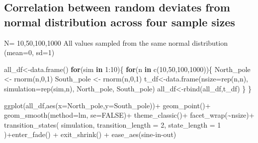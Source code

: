 \documentclass[
  letterpaper,
  DIV=11,
  numbers=noendperiod]{scrreprt}
\newenvironment{Shaded}{\begin{snugshade}}{\end{snugshade}}
\newcommand{\AttributeTok}[1]{\textcolor[rgb]{0.40,0.45,0.13}{#1}}
\newcommand{\ConstantTok}[1]{\textcolor[rgb]{0.56,0.35,0.01}{#1}}
\newcommand{\ControlFlowTok}[1]{\textcolor[rgb]{0.00,0.23,0.31}{\textbf{#1}}}
\newcommand{\DecValTok}[1]{\textcolor[rgb]{0.68,0.00,0.00}{#1}}
\newcommand{\FunctionTok}[1]{\textcolor[rgb]{0.28,0.35,0.67}{#1}}
\newcommand{\NormalTok}[1]{\textcolor[rgb]{0.00,0.23,0.31}{#1}}
\newcommand{\OtherTok}[1]{\textcolor[rgb]{0.00,0.23,0.31}{#1}}
\newcommand{\SpecialCharTok}[1]{\textcolor[rgb]{0.37,0.37,0.37}{#1}}
\newcommand{\StringTok}[1]{\textcolor[rgb]{0.13,0.47,0.30}{#1}}
\begin{document}
\subsection{Correlation between random deviates from normal distribution
across four sample
sizes}\label{correlation-between-random-deviates-from-normal-distribution-across-four-sample-sizes}

N= 10,50,100,1000 All values sampled from the same normal distribution
(mean=0, sd=1)

\begin{Shaded}
\begin{Highlighting}[]
\NormalTok{all\_df}\OtherTok{\textless{}{-}}\FunctionTok{data.frame}\NormalTok{()}
\ControlFlowTok{for}\NormalTok{(sim }\ControlFlowTok{in} \DecValTok{1}\SpecialCharTok{:}\DecValTok{10}\NormalTok{)\{}
  \ControlFlowTok{for}\NormalTok{(n }\ControlFlowTok{in} \FunctionTok{c}\NormalTok{(}\DecValTok{10}\NormalTok{,}\DecValTok{50}\NormalTok{,}\DecValTok{100}\NormalTok{,}\DecValTok{1000}\NormalTok{))\{}
\NormalTok{  North\_pole }\OtherTok{\textless{}{-}} \FunctionTok{rnorm}\NormalTok{(n,}\DecValTok{0}\NormalTok{,}\DecValTok{1}\NormalTok{)}
\NormalTok{  South\_pole }\OtherTok{\textless{}{-}} \FunctionTok{rnorm}\NormalTok{(n,}\DecValTok{0}\NormalTok{,}\DecValTok{1}\NormalTok{)}
\NormalTok{  t\_df}\OtherTok{\textless{}{-}}\FunctionTok{data.frame}\NormalTok{(}\AttributeTok{nsize=}\FunctionTok{rep}\NormalTok{(n,n),}
                   \AttributeTok{simulation=}\FunctionTok{rep}\NormalTok{(sim,n),}
\NormalTok{                                  North\_pole,}
\NormalTok{                                  South\_pole)}
\NormalTok{  all\_df}\OtherTok{\textless{}{-}}\FunctionTok{rbind}\NormalTok{(all\_df,t\_df)}
\NormalTok{  \}}
\NormalTok{\}}


\FunctionTok{ggplot}\NormalTok{(all\_df,}\FunctionTok{aes}\NormalTok{(}\AttributeTok{x=}\NormalTok{North\_pole,}\AttributeTok{y=}\NormalTok{South\_pole))}\SpecialCharTok{+}
  \FunctionTok{geom\_point}\NormalTok{()}\SpecialCharTok{+}
  \FunctionTok{geom\_smooth}\NormalTok{(}\AttributeTok{method=}\NormalTok{lm, }\AttributeTok{se=}\ConstantTok{FALSE}\NormalTok{)}\SpecialCharTok{+}
  \FunctionTok{theme\_classic}\NormalTok{()}\SpecialCharTok{+}
  \FunctionTok{facet\_wrap}\NormalTok{(}\SpecialCharTok{\textasciitilde{}}\NormalTok{nsize)}\SpecialCharTok{+}
  \FunctionTok{transition\_states}\NormalTok{(}
\NormalTok{    simulation,}
    \AttributeTok{transition\_length =} \DecValTok{2}\NormalTok{,}
    \AttributeTok{state\_length =} \DecValTok{1}
\NormalTok{  )}\SpecialCharTok{+}\FunctionTok{enter\_fade}\NormalTok{() }\SpecialCharTok{+} 
  \FunctionTok{exit\_shrink}\NormalTok{() }\SpecialCharTok{+}
  \FunctionTok{ease\_aes}\NormalTok{(}\StringTok{\textquotesingle{}sine{-}in{-}out\textquotesingle{}}\NormalTok{)}
\end{Highlighting}
\end{Shaded}
\end{document}
